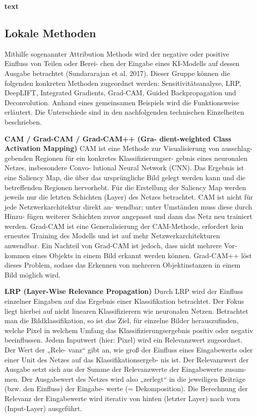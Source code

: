 \documentclass[11pt,a4paper]{article}
\numberwithin{equation}{section}
\begin{document}
	\noindent \textbf{text}
	\subsection{Lokale Methoden}
	Mithilfe sogenannter Attribution Methods wird der
	negative oder positive Einfluss von Teilen oder Berei-
	chen der Eingabe eines KI-Modells auf dessen Ausgabe
	betrachtet (Sundararajan et al. 2017). Dieser Gruppe
	können die folgenden konkreten Methoden zugeordnet
	werden: Sensitivitätsanalyse, LRP, DeepLIFT, Integrated
	Gradients, Grad-CAM, Guided Backpropagation und
	Deconvolution. Anhand eines gemeinsamen Beispiels
	wird die Funktionsweise erläutert. Die Unterschiede
	sind in den nachfolgenden technischen Einzelheiten
	beschrieben.
	
	\noindent \textbf{CAM / Grad-CAM / Grad-CAM++ (Gra-
		dient-weighted Class Activation Mapping)}
	CAM ist eine Methode zur Visualisierung von ausschlag-
	gebenden Regionen für ein konkretes Klassifizierungser-
	gebnis eines neuronalen Netzes, insbesondere Convo-
	lutional Neural Network (CNN). Das Ergebnis ist eine
	Saliency Map, die über das ursprüngliche Bild gelegt
	werden kann und die betreffenden Regionen hervorhebt.
	Für die Erstellung der Saliency Map werden jeweils nur
	die letzten Schichten (Layer) des Netzes betrachtet.
	CAM ist nicht für jede Netzwerkarchitektur direkt an-
	wendbar; unter Umständen muss diese durch Hinzu-
	fügen weiterer Schichten zuvor angepasst und dann das
	Netz neu trainiert werden.
	Grad-CAM ist eine Generalisierung der CAM-Methode,
	erfordert kein erneutes Training des Modells und ist auf
	mehr Netzwerkarchitekturen anwendbar. Ein Nachteil
	von Grad-CAM ist jedoch, dass nicht mehrere Vor-
	kommen eines Objekts in einem Bild erkannt werden
	können. Grad-CAM++ löst dieses Problem, sodass das
	Erkennen von mehreren Objektinstanzen in einem Bild
	möglich wird.
	
	
	\noindent \textbf{LRP (Layer-Wise Relevance Propagation)}
	Durch LRP wird der Einfluss einzelner Eingaben auf das
		Ergebnis einer Klassifikation betrachtet. Der Fokus liegt
		hierbei auf nicht linearen Klassifizierern wie neuronalen
		Netzen. Betrachtet man die Bildklassifikation, so ist das
		Ziel, für einzelne Bilder herauszufinden, welche Pixel in
		welchem Umfang das Klassifizierungsergebnis positiv
		oder negativ beeinflussen. Jedem Inputwert (hier: Pixel)
		wird ein Relevanzwert zugeordnet. Der Wert der „Rele-
		vanz“ gibt an, wie groß der Einfluss eines Eingabewerts
		oder einer Unit des Netzes auf das Klassifikationsergeb-
		nis ist. Der Relevanzwert der Ausgabe setzt sich aus der
		Summe der Relevanzwerte der Eingabewerte zusam-
		men. Der Ausgabewert des Netzes wird also „zerlegt“ in
		die jeweiligen Beiträge (bzw. den Einfluss) der Eingabe-
		werte (= Dekomposition). Die Berechnung der Relevanz
		der Eingabewerte wird iterativ von hinten (letzter Layer)
		nach vorn (Input-Layer) ausgeführt.
	
\end{document}
